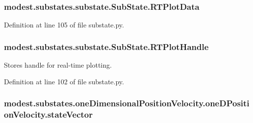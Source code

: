 \subsubsection[{\texorpdfstring{R\+T\+Plot\+Data}{RTPlotData}}]{\setlength{\rightskip}{0pt plus 5cm}modest.\+substates.\+substate.\+Sub\+State.\+R\+T\+Plot\+Data\hspace{0.3cm}{\ttfamily [inherited]}}\hypertarget{classmodest_1_1substates_1_1substate_1_1SubState_a9fefae1facc797a1132fb61a55e9ffa1}{}\label{classmodest_1_1substates_1_1substate_1_1SubState_a9fefae1facc797a1132fb61a55e9ffa1}


Definition at line 105 of file substate.\+py.

\subsubsection[{\texorpdfstring{R\+T\+Plot\+Handle}{RTPlotHandle}}]{\setlength{\rightskip}{0pt plus 5cm}modest.\+substates.\+substate.\+Sub\+State.\+R\+T\+Plot\+Handle\hspace{0.3cm}{\ttfamily [inherited]}}\hypertarget{classmodest_1_1substates_1_1substate_1_1SubState_a37ded775b84cea85b4dce0f1b16286c4}{}\label{classmodest_1_1substates_1_1substate_1_1SubState_a37ded775b84cea85b4dce0f1b16286c4}


Stores handle for real-\/time plotting. 



Definition at line 102 of file substate.\+py.

\subsubsection[{\texorpdfstring{state\+Vector}{stateVector}}]{\setlength{\rightskip}{0pt plus 5cm}modest.\+substates.\+one\+Dimensional\+Position\+Velocity.\+one\+D\+Position\+Velocity.\+state\+Vector}\hypertarget{classmodest_1_1substates_1_1oneDimensionalPositionVelocity_1_1oneDPositionVelocity_a685cabbbc121aa8e0bca238d5dd1b370}{}\label{classmodest_1_1substates_1_1oneDimensionalPositionVelocity_1_1oneDPositionVelocity_a685cabbbc121aa8e0bca238d5dd1b370}


